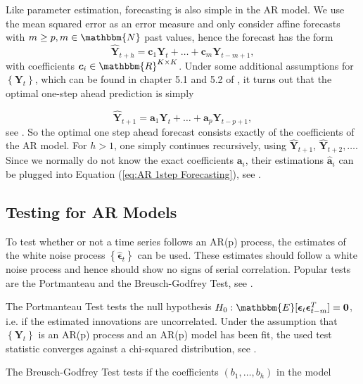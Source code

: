 Like parameter estimation, forecasting is also simple in the AR model. We use the mean squared error as an error measure and only consider affine forecasts with $m\geq p,m \in \mathbbm{N}$ past values, hence the forecast has the form
\begin{equation}
\hat{\bm{Y}}_{t+h} = \bm{c}_1\bm{Y}_{t} + \ldots + \bm{c}_m\bm{Y}_{t-m+1},
\label{eq:Forecasting general}
\end{equation}
%
with coefficients $\bm{c}_i \in \mathbbm{R}^{K \times K}$. Under some additional assumptions for $\left\{\bm{Y}_t\right\}$, which can be found in chapter 5.1 and 5.2 of \textcite{Scherrer:2021}, it turns out that the optimal one-step ahead prediction is simply

\begin{equation}
\hat{\bm{Y}}_{t+1} = \bm{a}_1\bm{Y}_{t} + \ldots + \bm{a}_p\bm{Y}_{t-p+1},
\label{eq:AR 1step Forecasting}
\end{equation}
%
see \textcite{Scherrer:2021}. So the optimal one step ahead forecast consists exactly of the coefficients of the AR model. For $h>1$, one simply continues recursively, using $\hat{\bm{Y}}_{t+1}$, $\hat{\bm{Y}}_{t+2},\ldots$. Since we normally do not know the exact coefficients $\bm{a}_i$, their estimations $\hat{\bm{a}}_i$ can be plugged into Equation (\ref{eq:AR 1step Forecasting}), see \textcite{Scherrer:2021}. 

\subsection{Testing for AR Models}
\label{sec: Testing for ar models}

To test whether or not a time series follows an AR(p) process, the estimates of the white noise process $\left\{\hat{\bm{\epsilon}}_t\right\}$ can be used. These estimates should follow a white noise process and hence should show no signs of serial correlation. Popular tests are the Portmanteau and the Breusch-Godfrey Test, see \textcite{Lütkepohl:2007}. 

The Portmanteau Test tests the null hypothesis $H_0: \mathbbm{E}[\bm{\epsilon}_t \bm{\epsilon}_{t-m}^T]=\bm{0}$, i.e. if the estimated innovations are uncorrelated. Under the assumption that $\left\{\bm{Y}_t\right\}$ is an AR(p) process and an AR(p) model has been fit, the used test statistic converges against a chi-squared distribution, see \textcite{Lütkepohl:2007}. 

The Breusch-Godfrey Test tests if the coefficients $(b_1,\ldots,b_h)$ in the model 

